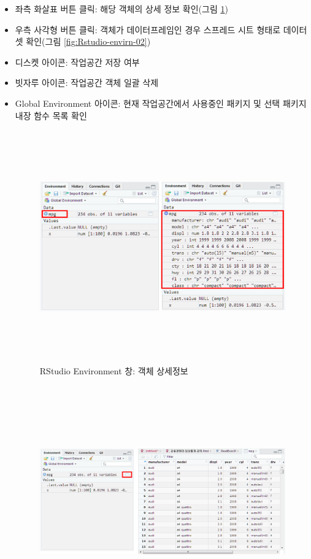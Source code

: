 \documentclass[12pt,a4paper]{book}
\providecommand{\tightlist}{%
  \setlength{\itemsep}{0pt}\setlength{\parskip}{0pt}}
\theoremstyle{definition}
\theoremstyle{definition}
\theoremstyle{definition}
\theoremstyle{remark}
\begin{document}
\begin{enumerate}
\begin{enumerate}
    \begin{itemize}
    \tightlist
    \item
      좌측 화살표 버튼 클릭: 해당 객체의 상세 정보 확인(그림
      \ref{fig:Rstudio-envirn-01})
    \item
      우측 사각형 버튼 클릭: 객체가 데이터프레임인 경우 스프레드 시트
      형태로 데이터셋 확인(그림 \ref{fig:Rstudio-envirn-02})
    \item
      디스켓 아이콘: 작업공간 저장 여부
    \item
      빗자루 아이콘: 작업공간 객체 일괄 삭제
    \item
      Global Environment 아이콘: 현재 작업공간에서 사용중인 패키지 및
      선택 패키지 내장 함수 목록 확인

      \begin{figure}[H] {
        \centering
        \includegraphics[width = 12cm, height = 10cm]{Figures/Rstudio-envwin-01.png}
        \caption[RStudio Environment 창: 객체 상세정보]{RStudio Environment 창: 객체 상세정보}\label{fig:Rstudio-envirn-01}
      } \end{figure}\begin{figure}[H] {
        \centering
        \includegraphics[width = 15cm, height = 10cm]{Figures/Rstudio-envwin-02.png}
}
\end{figure}
\end{itemize}
\end{enumerate}
\end{enumerate}
\end{document}
